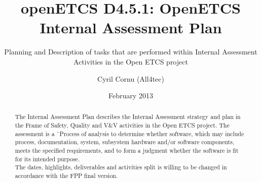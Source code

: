 \documentclass{template/openetcs_report}
\begin{document}
\frontmatter
{}




\title{openETCS D4.5.1: OpenETCS Internal Assessment Plan}

\subtitle{Planning and Description of tasks that are performed within Internal Assessment Activities in the Open ETCS project}

\date{February 2013}

\author{Cyril Cornu (All4tec)}






\begin{abstract}
The Internal Assessment Plan describes the Internal Assessment strategy and plan in the Frame of Safety, Quality and V\&V activities in the Open ETCS project.
The assessment is a \"\ Process of analysis to determine whether software, which may include process, documentation, system, subsystem hardware and/or software components, meets the specified requirements, and to form a judgment whether the software is fit for its intended purpose.\"
\\
The dates, highlights, deliverables and activities split is willing to be changed in accordance with the FPP final version.
\end{abstract}

\maketitle
\tableofcontents

\end{document}
